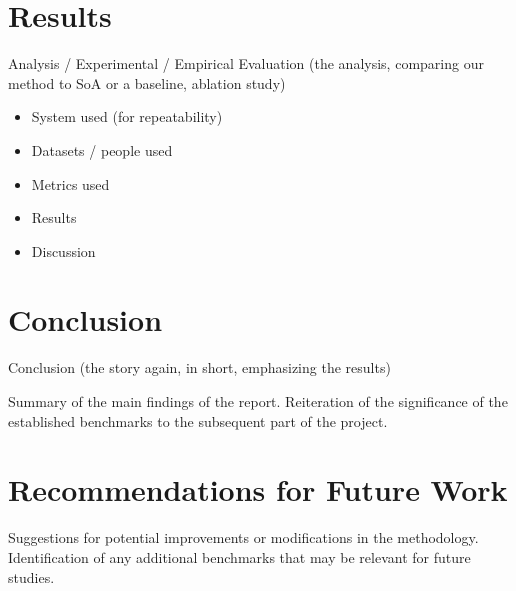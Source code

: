 \section{Results}
Analysis / Experimental / Empirical Evaluation (the analysis, comparing our method to SoA or a baseline, ablation study)
\begin{itemize}
    \item System used (for repeatability)
    \item Datasets / people used
    \item Metrics used
    \item Results
    \item Discussion
\end{itemize}

\section{Conclusion}
Conclusion (the story again, in short, emphasizing the results)

Summary of the main findings of the report.
Reiteration of the significance of the established benchmarks to the subsequent part of the project.

\section{Recommendations for Future Work}
Suggestions for potential improvements or modifications in the methodology.
Identification of any additional benchmarks that may be relevant for future studies.
